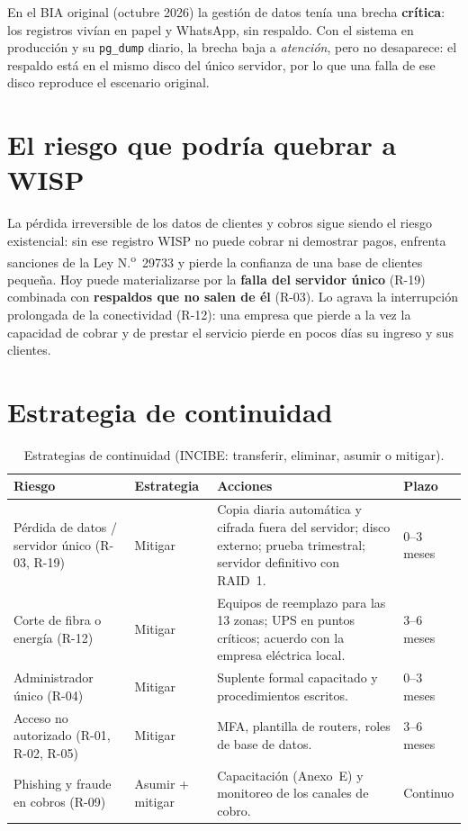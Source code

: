 \noindent En el BIA original (octubre 2026) la gestión de datos tenía una brecha
\textbf{crítica}: los registros vivían en papel y WhatsApp, sin respaldo. Con el sistema en
producción y su \texttt{pg\_dump} diario, la brecha baja a \emph{atención}, pero no
desaparece: el respaldo está en el mismo disco del único servidor, por lo que una falla de
ese disco reproduce el escenario original.

\section{El riesgo que podría quebrar a WISP}
La pérdida irreversible de los datos de clientes y cobros sigue siendo el riesgo existencial:
sin ese registro WISP no puede cobrar ni demostrar pagos, enfrenta sanciones de la Ley
N.\textsuperscript{o}~29733 y pierde la confianza de una base de clientes pequeña. Hoy puede
materializarse por la \textbf{falla del servidor único} (R-19) combinada con
\textbf{respaldos que no salen de él} (R-03). Lo agrava la interrupción prolongada de la
conectividad (R-12): una empresa que pierde a la vez la capacidad de cobrar y de prestar el
servicio pierde en pocos días su ingreso y sus clientes.

\section{Estrategia de continuidad}

\begin{table}[H]
\centering
\caption{Estrategias de continuidad (INCIBE: transferir, eliminar, asumir o mitigar).}
\label{tab:anx-pcn-estrategia}
\small
\begin{tabularx}{\textwidth}{L{3.2cm}L{1.6cm}XL{1.6cm}}
\toprule
\textbf{Riesgo} & \textbf{Estrategia} & \textbf{Acciones} & \textbf{Plazo} \\
\midrule
Pérdida de datos / servidor único (R-03, R-19) & Mitigar & Copia diaria automática y cifrada fuera del servidor; disco externo; prueba trimestral; servidor definitivo con RAID~1. & 0--3 meses \\
Corte de fibra o energía (R-12) & Mitigar & Equipos de reemplazo para las 13 zonas; UPS en puntos críticos; acuerdo con la empresa eléctrica local. & 3--6 meses \\
Administrador único (R-04) & Mitigar & Suplente formal capacitado y procedimientos escritos. & 0--3 meses \\
Acceso no autorizado (R-01, R-02, R-05) & Mitigar & MFA, plantilla de routers, roles de base de datos. & 3--6 meses \\
Phishing y fraude en cobros (R-09) & Asumir + mitigar & Capacitación (Anexo~E) y monitoreo de los canales de cobro. & Continuo \\
\bottomrule
\end{tabularx}
\end{table}

